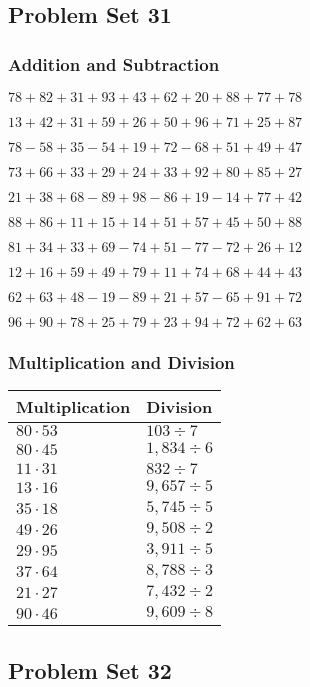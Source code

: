 \hypertarget{problem-set-31-1}{%
\subsection{Problem Set 31}\label{problem-set-31-1}}

\hypertarget{addition-and-subtraction-71}{%
\subsubsection{Addition and
Subtraction}\label{addition-and-subtraction-71}}

\(78+82+31+93+43+62+20+88+77+ 78\)

\(13+42+31+59+26+50+96+71+25+87\)

\(78-58+35-54+19+72-68+51+49+47\)

\(73+66+33+29+24+33+92+80+85+27\)

\(21+38+68-89+98-86+19-14+77+42\)

\(88+86+11+15+14+51+57+45+50+88\)

\(81+34+33+69-74+51-77-72+26+12\)

\(12+16+59+49+79+11+74+68+44+43\)

\(62+63+48-19-89+21+57-65+91+72\)

\(96+90+78+25+79+23+94+72+62+63\)

\hypertarget{multiplication-and-division-71}{%
\subsubsection{Multiplication and
Division}\label{multiplication-and-division-71}}

\begin{longtable}[]{@{}ll@{}}
\toprule
Multiplication & Division\tabularnewline
\midrule
\endhead
\(80\cdot53\) & \(103÷7\)\tabularnewline
\(80\cdot45\) & \(1,834÷6\)\tabularnewline
\(11\cdot31\) & \(832÷7\)\tabularnewline
\(13\cdot16\) & \(9,657÷5\)\tabularnewline
\(35\cdot18\) & \(5,745÷5\)\tabularnewline
\(49\cdot26\) & \(9,508÷2\)\tabularnewline
\(29\cdot95\) & \(3,911÷5\)\tabularnewline
\(37\cdot64\) & \(8,788÷3\)\tabularnewline
\(21\cdot27\) & \(7,432÷2\)\tabularnewline
\(90\cdot46\) & \(9,609÷8\)\tabularnewline
\bottomrule
\end{longtable}

\hypertarget{problem-set-32-1}{%
\subsection{Problem Set 32}\label{problem-set-32-1}}

